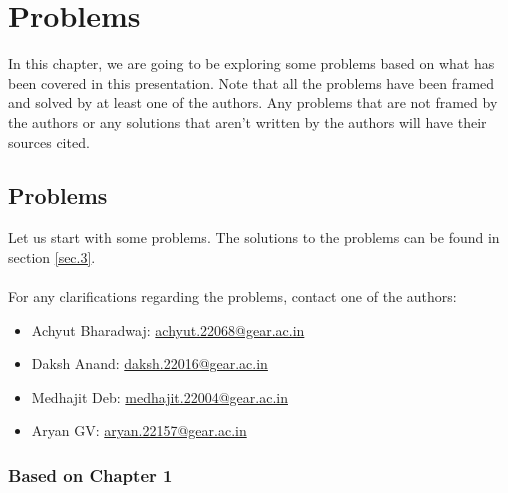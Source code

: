 \documentclass[a4paper]{report}
\begin{document}
\chapter{Problems}
In this chapter, we are going to be exploring some problems based on what has been covered in this presentation.
Note that all the problems have been framed and solved by at least one of the authors. Any problems that are not
framed by the authors or any solutions that aren't written by the authors will have their sources cited.

\section{Problems} \label{sec.4}
Let us start with some problems. The solutions to the problems can be found in section \ref{sec.3}.\\\\
For any clarifications regarding the problems, contact one of the authors: 
\begin{itemize}
  \item Achyut Bharadwaj: \href{mailto:achyut.22068@gear.ac.in}{achyut.22068@gear.ac.in}
  \item Daksh Anand: \href{mailto:daksh.22016@gear.ac.in}{daksh.22016@gear.ac.in}
  \item Medhajit Deb: \href{mailto:medhajit.22004@gear.ac.in}{medhajit.22004@gear.ac.in}
  \item Aryan GV: \href{mailto:aryan.22157@gear.ac.in}{aryan.22157@gear.ac.in}
\end{itemize}

\subsection{Based on Chapter 1}
  \begin{tcolorbox}
  \end{tcolorbox}
  \begin{tcolorbox}
  \end{tcolorbox}
  \begin{tcolorbox}
  \end{tcolorbox}
\end{document}
